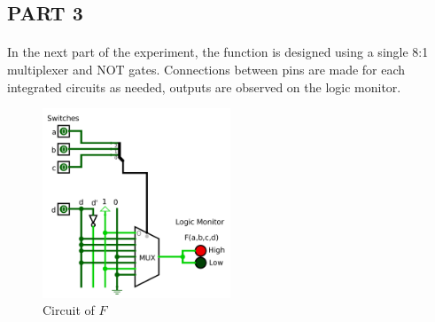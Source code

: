 \documentclass[pdftex,12pt,a4paper]{article}
\begin{document}
\begin{flushleft}
\subsection{PART 3}
\paragraph{}
In the next part of the experiment, the function is designed using a single 8:1 multiplexer and NOT gates. Connections between pins are made for each integrated circuits as needed, outputs are observed on the logic monitor. 


\begin{figure}[!h]
	\centering
	\includegraphics[width=0.5\textwidth]{part3.png}	
	\caption{Circuit of $F$}
	\label{fig1}
\end{figure}


\end{flushleft}
\end{document}
